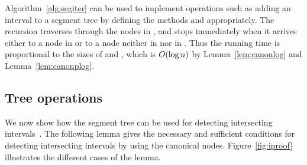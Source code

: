 \documentclass[english,gradu]{tktltiki2018}
\begin{document}
Algorithm~\ref{alg:segiter} can be used to implement operations such as adding an interval to a segment tree by defining the methods \visitc and \visitp appropriately.
The recursion traverses through the nodes in , and stops immediately when it arrives either to a node in  or to a node neither in  nor in .
Thus the running time is proportional to the sizes of  and , which is $O(\log n)$ by Lemma~\ref{lem:canonlog} and Lemma~\ref{lem:canonplog}.

\subsection{Tree operations}\label{sec:treeops}

We now show how the segment tree can be used for detecting intersecting intervals~\cite[Chapter 10]{berg2008}.
The following lemma gives the necessary and sufficient conditions for detecting intersecting intervals by using the canonical nodes.
Figure~\ref{fig:iproof} illustrates the different cases of the lemma.
\end{document}
